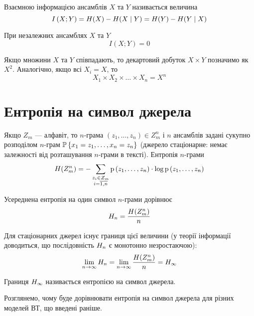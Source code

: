 \begin{definition}
    Взаємною інформацією ансамблів $X$ та $Y$ називається величина 
    $$I\left( X; Y \right)
        = H\!\left( X \right)-H\!\left( X \;\middle|\; Y \right)
        = H\!\left( Y \right)-H\!\left( Y \;\middle|\; X \right)$$

    При незалежних ансамблях $X$ та $Y$
    $$I\left( X; Y \right) = 0$$
\end{definition}

Якщо множини $X$ та $Y$ співпадають, то декартовий добуток
$X \times Y$ позначимо як  $X^2$.
Аналогічно, якщо всі $X_i=X$, то
$$X_1 \times X_2 \times \dots \times X_n=X^n$$

\section{Ентропія на символ джерела}

Якщо $Z_m$ --- алфавіт, то $n$-грама 
$\left( z_{1},\dots,z_{n} \right) \in Z_{m}^{n}$ і $n$
ансамблів задані сукупно розподілом $n$-грам 
$\mathbb{P}\left\{ x_{1}=z_{1},\dots,x_{n}=z_{n} \right\}$
(джерело стаціонарне: немає залежності від розташування $n$-грами в тексті).
Ентропія $n$-грами
\begin{equation}\label{eq:nGramEntropy}
    H\!\left( Z_m^n \right)
        = - \sum_{\substack{z_i \in Z_m \\ i = \overline{1,n}}}
            \mathrm{p}\left(z_1, \dots, z_n\right) \cdot \log{\mathrm{p}\left(z_1, \dots, z_n\right)}
\end{equation}

Усереднена ентропія на один символ $n${}-грами дорівнює 
$$H_{n}=\frac{H\!\left( Z_m^n \right)}{n}$$

Для стаціонарних джерел існує границя цієї величини (у теорії інформації
доводиться, що послідовність  $H_{n}$ є монотонно незростаючою):
$$\lim_{n\to\infty}H_{n}
    =\lim_{n\to\infty}\frac{H\!\left( Z_m^n \right)}{n}
    =H_{\infty}$$

\begin{definition}
Границя $H_\infty$ називається ентропією на символ джерела. 
\end{definition}


Розглянемо, чому буде дорівнювати ентропія на символ джерела для різних моделей
ВТ, що введені раніше.

